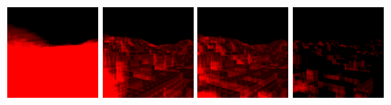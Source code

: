 \begin{figure}[!htb]
  \centering
  \includegraphics[height=100px]{images/graphics/overdraw-terrain1-nocull.png}
  \includegraphics[height=100px]{images/graphics/overdraw-terrain1-pooc.png}
  \includegraphics[height=100px]{images/graphics/overdraw-terrain1-pmoc.png}
  \includegraphics[height=100px]{images/graphics/overdraw-terrain1-diff.png}


\end{figure}
